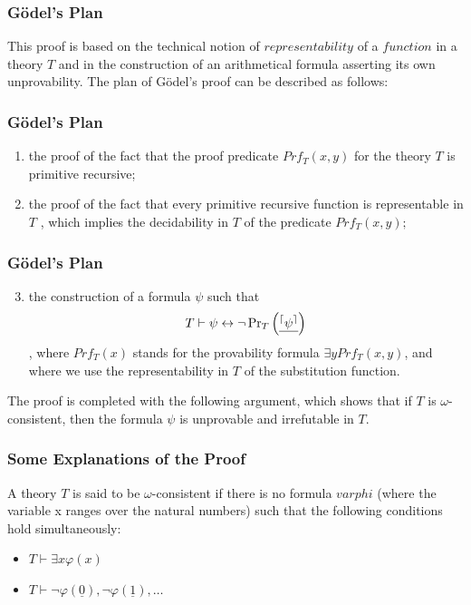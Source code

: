\documentclass[aspectratio=169]{beamer}
\begin{document}
\begin{frame}
	\frametitle{Gödel's Plan}
	This proof is based on the technical notion of $representability$ of a $function$ in a theory $T$ and in the construction of an arithmetical formula asserting its own unprovability. The plan of Gödel's proof can be described as follows: \cite{bekl}
\end{frame}

\begin{frame}
	\frametitle{Gödel's Plan}
	\begin{enumerate}
		\item the proof of the fact that the proof predicate $Prf_T (x, y) $ for the theory $T$ is primitive recursive;
		\item the proof of the fact that every primitive recursive function is representable in $T$ , which implies the decidability in $T$ of the predicate $Prf_T (x, y);$
	\end{enumerate}
\end{frame}

\begin{frame}
	\frametitle{Gödel's Plan}
	\begin{enumerate}
	\setcounter{enumi}{2}
		\item the construction of a formula $\psi$ such that
		\[ T \vdash \psi \leftrightarrow \neg \operatorname{Pr}_{T}\left(\text{\underline{$^{\lceil} \psi^{\rceil}$}}\right) \]
		, where $Prf_T(x)$ stands for the provability formula $\exists y Prf_{T}(x, y)$, and where we
		use the representability in $T$ of the substitution function.
	\end{enumerate}
	The proof is completed with the following argument, which shows that if $T$ is $\omega$-consistent, then the formula $\psi$ is unprovable and irrefutable in $T$.
	\begin{flushright}
		\cite{bekl}
	\end{flushright}
\end{frame}

\begin{frame}
	\frametitle{Some Explanations of the Proof}
	\begin{Definition}
		A theory $T$ is said to be $\omega$-consistent if there is no formula $varphi$ (where the variable x ranges over the natural numbers) such that the following conditions hold simultaneously:
		\begin{itemize}
			\item $T \vdash \exists x \varphi(x)$
			\item $T \vdash \neg \varphi(\underline{0}), \neg \varphi(\underline{1}), \ldots$
		\end{itemize}
	\begin{flushright}
		\cite{bekl}
	\end{flushright}
	\end{Definition}
\end{frame}
\end{document}
